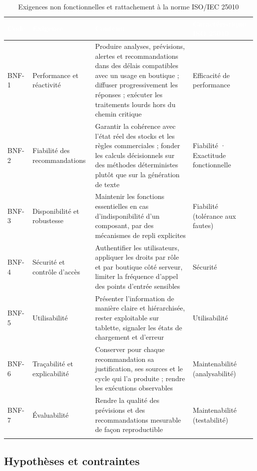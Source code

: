 \begin{longtable}{|P{1.5cm}|P{3.0cm}|P{6.4cm}|P{3.0cm}|}
\hline
{}
\textcolor{white}{\textbf{Code}} &
\textcolor{white}{\textbf{Exigence}} &
\textcolor{white}{\textbf{Contenu}} &
\textcolor{white}{\textbf{Caractéristique ISO 25010}} \\
\hline
\endhead
\hline
\endfoot
\hline
\endlastfoot
BNF-1 & Performance et réactivité & Produire analyses, prévisions, alertes et recommandations dans des délais compatibles avec un usage en boutique ; diffuser progressivement les réponses ; exécuter les traitements lourds hors du chemin critique & Efficacité de performance \\
\hline
BNF-2 & Fiabilité des recommandations & Garantir la cohérence avec l'état réel des stocks et les règles commerciales ; fonder les calculs décisionnels sur des méthodes déterministes plutôt que sur la génération de texte & Fiabilité · Exactitude fonctionnelle \\
\hline
BNF-3 & Disponibilité et robustesse & Maintenir les fonctions essentielles en cas d'indisponibilité d'un composant, par des mécanismes de repli explicites & Fiabilité (tolérance aux fautes) \\
\hline
BNF-4 & Sécurité et contrôle d'accès & Authentifier les utilisateurs, appliquer les droits par rôle et par boutique côté serveur, limiter la fréquence d'appel des points d'entrée sensibles & Sécurité \\
\hline
BNF-5 & Utilisabilité & Présenter l'information de manière claire et hiérarchisée, rester exploitable sur tablette, signaler les états de chargement et d'erreur & Utilisabilité \\
\hline
BNF-6 & Traçabilité et explicabilité & Conserver pour chaque recommandation sa justification, ses sources et le cycle qui l'a produite ; rendre les exécutions observables & Maintenabilité (analysabilité) \\
\hline
BNF-7 & Évaluabilité & Rendre la qualité des prévisions et des recommandations mesurable de façon reproductible & Maintenabilité (testabilité) \\
\hline
\caption{Exigences non fonctionnelles et rattachement à la norme ISO/IEC 25010}
\label{tab:exigences-nf-chap2}
\end{longtable}

\subsection{Hypothèses et contraintes}
\label{sec:contraintes}

